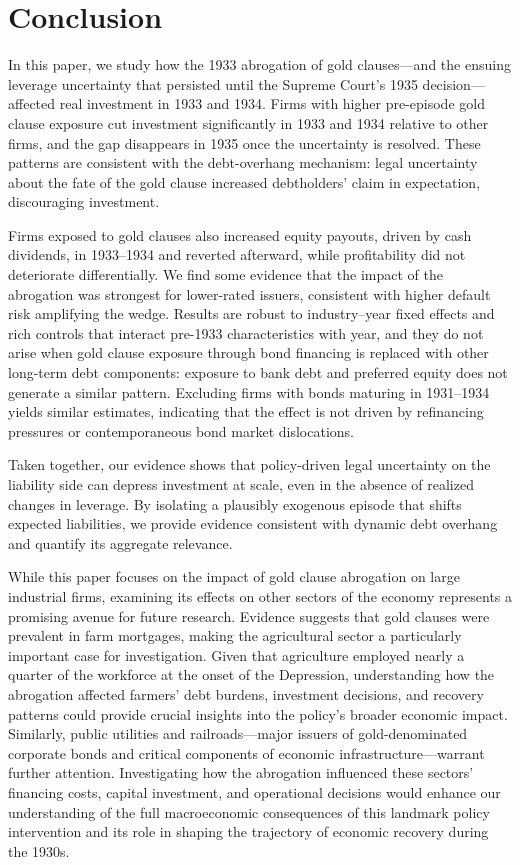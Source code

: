 \section{Conclusion}
\label{sec:conc}

\noindent In this paper, we study how the 1933 abrogation of gold clauses---and the ensuing leverage uncertainty that persisted until the Supreme Court's 1935 decision---affected real investment in 1933 and 1934. Firms with higher pre-episode gold clause exposure cut investment significantly in 1933 and 1934 relative to other firms, and the gap disappears in 1935 once the uncertainty is resolved. These patterns are consistent with the debt-overhang mechanism: legal uncertainty about the fate of the gold clause increased debtholders' claim in expectation, discouraging investment.

Firms exposed to gold clauses also increased equity payouts, driven by cash dividends, in 1933--1934 and reverted afterward, while profitability did not deteriorate differentially. We find some evidence that the impact of the abrogation was strongest for lower-rated issuers, consistent with higher default risk amplifying the wedge. Results are robust to industry--year fixed effects and rich controls that interact pre-1933 characteristics with year, and they do not arise when gold clause exposure through bond financing is replaced with other long-term debt components: exposure to bank debt and preferred equity does not generate a similar pattern. Excluding firms with bonds maturing in 1931--1934 yields similar estimates, indicating that the effect is not driven by refinancing pressures or contemporaneous bond market dislocations.

Taken together, our evidence shows that policy-driven legal uncertainty on the liability side can depress investment at scale, even in the absence of realized changes in leverage. By isolating a plausibly exogenous episode that shifts expected liabilities, we provide evidence consistent with dynamic debt overhang and quantify its aggregate relevance.

While this paper focuses on the impact of gold clause abrogation on large industrial firms, examining its effects on other sectors of the economy represents a promising avenue for future research. Evidence suggests that gold clauses were prevalent in farm mortgages, making the agricultural sector a particularly important case for investigation. Given that agriculture employed nearly a quarter of the workforce at the onset of the Depression, understanding how the abrogation affected farmers' debt burdens, investment decisions, and recovery patterns could provide crucial insights into the policy's broader economic impact. Similarly, public utilities and railroads---major issuers of gold-denominated corporate bonds and critical components of economic infrastructure---warrant further attention. Investigating how the abrogation influenced these sectors' financing costs, capital investment, and operational decisions would enhance our understanding of the full macroeconomic consequences of this landmark policy intervention and its role in shaping the trajectory of economic recovery during the 1930s.